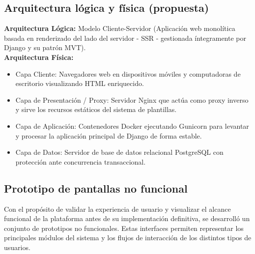 \documentclass{article}
\begin{document}
\subsection{Arquitectura lógica y física (propuesta)} 
\textbf{Arquitectura Lógica:} Modelo Cliente-Servidor (Aplicación web monolítica basada en renderizado del lado del servidor - SSR - gestionada íntegramente por Django y su patrón MVT).  \\
\textbf{Arquitectura Física:} 
\begin{itemize}
    \item Capa Cliente: Navegadores web en dispositivos móviles y computadoras de escritorio visualizando HTML enriquecido. 
    \item Capa de Presentación / Proxy: Servidor Nginx que actúa como proxy inverso y sirve los recursos estáticos del sistema de plantillas. 
    \item Capa de Aplicación: Contenedores Docker ejecutando Gunicorn para levantar y procesar la aplicación principal de Django de forma estable. 
    \item Capa de Datos: Servidor de base de datos relacional PostgreSQL con protección ante concurrencia transaccional. 
\end{itemize}

\subsection{Prototipo de pantallas no funcional}

Con el propósito de validar la experiencia de usuario y visualizar el alcance funcional de la plataforma antes de su implementación definitiva, se desarrolló un conjunto de prototipos no funcionales. Estas interfaces permiten representar los principales módulos del sistema y los flujos de interacción de los distintos tipos de usuarios.
\end{document}
